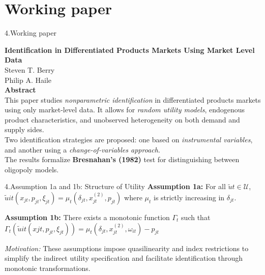 \documentclass[aspectratio=169]{beamer}  %
\begin{document}
\section{Working paper}
\begin{frame}{4.Working paper}
\centering

\large\textbf{Identification in Differentiated Products Markets Using Market Level Data} \\[1.5em]

\large Steven T. Berry \\
Philip A. Haile \\[1em]

\small
\textbf{Abstract } \\[0.8em]

This paper studies \textit{nonparametric identification} in differentiated products markets using only market-level data. It allows for \textit{random utility models}, endogenous product characteristics, and unobserved heterogeneity on both demand and supply sides. \\[0.6em]

Two identification strategies are proposed: one based on \textit{instrumental variables}, and another using a \textit{change-of-variables approach}. \\[0.6em]

The results formalize \textbf{Bresnahan’s (1982)} test for distinguishing between oligopoly models.

\end{frame}

\begin{frame}{4.Assumption 1a and 1b: Structure of Utility}
\textbf{Assumption 1a:} For all $\tilde{u}t \in \mathcal{U}$, \quad $\tilde{u}{it}(x_{jt}, p_{jt}, \xi_{jt}) = \mu_t(\delta_{jt}, x_{jt}^{(2)}, p_{jt})$ \quad where $\mu_t$ is strictly increasing in $\delta_{jt}$.

\vspace{0.3cm}
\textbf{Assumption 1b:} There exists a monotonic function $\Gamma_t$ such that \
\quad $\Gamma_t(\tilde{u}{it}(x{jt}, p_{jt}, \xi_{jt})) = \mu_t(\delta_{jt}, x_{jt}^{(2)}, \omega_{it}) - p_{jt}$

\vspace{0.3cm}
\textit{Motivation:} These assumptions impose quasilinearity and index restrictions to simplify the indirect utility specification and facilitate identification through monotonic transformations.
\end{frame}
\end{document}
